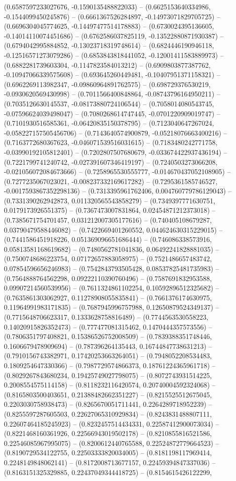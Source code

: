 (0.6587597233027676, -0.1590135488822033) -- (0.6625153640334986, -0.1544099450245876) -- (0.6661367526284897, -0.14973071829705725) -- (0.6696304045774625, -0.14497477514178883) -- (0.6730024395136605, -0.14014110074451686) -- (0.6762586037825119, -0.13522880871930387) -- (0.6794042995884852, -0.13023718319748614) -- (0.6824446190946118, -0.12516571273079286) -- (0.6853843818441052, -0.12001411583889973) -- (0.6882281739603304, -0.1147823584013212) -- (0.6909803877387762, -0.10947066339575608) -- (0.693645260449481, -0.10407951371158321) -- (0.6962269113982347, -0.09860964891762575) -- (0.698729376530219, -0.0930620569430998) -- (0.7011566400848864, -0.08743796164950211) -- (0.7035126630145537, -0.08173880724106544) -- (0.7058014080543745, -0.07596624039498047) -- (0.7080268614747445, -0.0701220909019747) -- (0.7101930516585361, -0.06420835150378795) -- (0.7123040647267024, -0.058227157505456706) -- (0.7143640574900879, -0.05218076663400216) -- (0.7163772680367623, -0.046071539516031615) -- (0.7183480242771758, -0.03990192105812401) -- (0.7202807507680679, -0.033674422937436194) -- (0.7221799741240742, -0.027391607346419197) -- (0.7240503273066208, -0.021056072084673666) -- (0.7258965530555777, -0.014670437052108905) -- (0.7277235067023021, -0.008237332169617282) -- (0.7295361585746527, -0.0017593867352298136) -- (0.7313395961762406, 0.004760779786129043) -- (0.7331390262942873, 0.011320565543858279) -- (0.7349397771630751, 0.0179173926551375) -- (0.7367473007831864, 0.02454871212373018) -- (0.7385671754701457, 0.031212007305177616) -- (0.740405108679287, 0.03790479588446082) -- (0.7422669401260552, 0.044624630315229015) -- (0.7441586451918226, 0.051369096651686444) -- (0.746086338573916, 0.05813581168619682) -- (0.7480562781041836, 0.06492241828881035) -- (0.7500748686223754, 0.07172657883058975) -- (0.7521486657483742, 0.07854596656246983) -- (0.7542843793505428, 0.08537825481735983) -- (0.7564888764562298, 0.09222110390760496) -- (0.7587691832953588, 0.09907214560539956) -- (0.7611324861102254, 0.10592896512325682) -- (0.7635861303062927, 0.11278908055835841) -- (0.7661376174630975, 0.11964991983171835) -- (0.7687945996757988, 0.12650879524349137) -- (0.7715648706623317, 0.1333628758816489) -- (0.7744563530558223, 0.14020915826352473) -- (0.777477081315462, 0.1470444357573556) -- (0.7806351797408821, 0.15386526752008509) -- (0.7839388351748446, 0.1606679478909694) -- (0.787396264135443, 0.16744847738631213) -- (0.7910156743382971, 0.17420253663264051) -- (0.7948052208534483, 0.1809254647330366) -- (0.7987729574866373, 0.18761224365961718) -- (0.8029267843680234, 0.19425749027798075) -- (0.8072743931514225, 0.2008554575114158) -- (0.8118232116420574, 0.20740004592324068) -- (0.8165803500403651, 0.21388482662351227) -- (0.8215525512675045, 0.2203030758938473) -- (0.8265670051711441, 0.2264289718952239) -- (0.8255597287605503, 0.22627065310929834) -- (0.8243831488807111, 0.22607464185245923) -- (0.8232457514434331, 0.22587412900073034) -- (0.8221468160361926, 0.22566943019502178) -- (0.8210855816521586, 0.22546085967995075) -- (0.8200612440765588, 0.22524872779664523) -- (0.8190729534122755, 0.22503333820034005) -- (0.8181198117969414, 0.2248149848062141) -- (0.8172008713677157, 0.22459394847337036) -- (0.8163151325329885, 0.22437049344418725) -- (0.8154615426122299, 